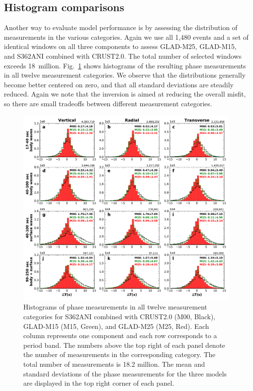 \documentclass[extra,mreferee]{gji}
\begin{document}
\subsection{Histogram comparisons}
\label{section:Histogram comparisons}

Another way to evaluate model performance is by assessing the distribution
of measurements in the various categories.
Again we use all 1,480 events and a set of identical windows on all three components
to assess GLAD-M25, GLAD-M15, and S362ANI combined with CRUST2.0.
The total number of selected windows exceeds 18~million.
Fig.~\ref{fig:phase_hist} shows histograms of the resulting phase
measurements in all twelve measurement categories.
We observe that the distributions generally become better centered on zero,
and that all standard deviations are steadily reduced.
Again we note that the inversion is aimed at reducing the overall misfit,
so there are small tradeoffs between different measurement categories.

\begin{figure}
  \centering
  \includegraphics[width=\textwidth]{figures/dt_histogram.pdf}
  \caption{Histograms of phase measurements in all twelve measurement categories for S362ANI combined with CRUST2.0 (M00, Black), GLAD-M15 (M15, Green), and GLAD-M25 (M25, Red).
  Each column represents one component and each row corresponds to a period band.
  The numbers above the top right of each panel denote the number of measurements in the corresponding category.
  The total number of measurements is 18.2 million.
  The mean and standard deviations of the phase measurements for the three models are displayed in the top right corner of each panel.}
  \label{fig:phase_hist}
\end{figure}
\end{document}
